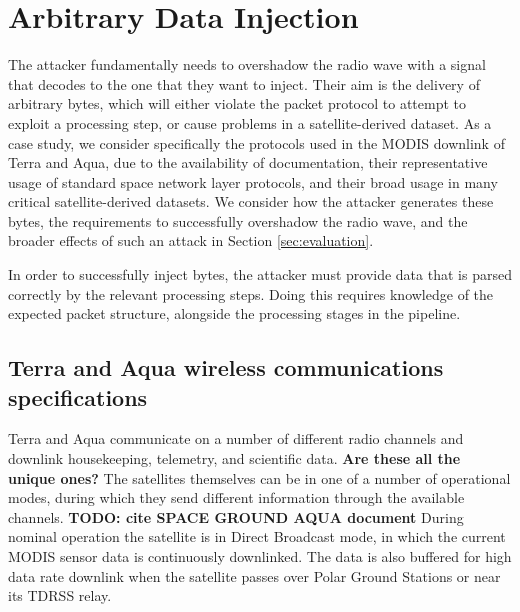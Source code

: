 \section{Arbitrary Data Injection}\label{sec:attack}


%
%


The attacker fundamentally needs to overshadow the radio wave with a signal that decodes to the one that they want to inject.
Their aim is the delivery of arbitrary bytes, which will either violate the packet protocol to attempt to exploit a processing step, or cause problems in a satellite-derived dataset.
As a case study, we consider specifically the protocols used in the MODIS downlink of Terra and Aqua, due to the availability of documentation, their representative usage of standard space network layer protocols, and their broad usage in many critical satellite-derived datasets.
We consider how the attacker generates these bytes, the requirements to successfully overshadow the radio wave, and the broader effects of such an attack in Section \ref{sec:evaluation}.

In order to successfully inject bytes, the attacker must provide data that is parsed correctly by the relevant processing steps.
Doing this requires knowledge of the expected packet structure, alongside the processing stages in the pipeline.

\subsection{Terra and Aqua wireless communications specifications} %

Terra and Aqua communicate on a number of different radio channels and downlink housekeeping, telemetry, and scientific data. \textbf{Are these all the unique ones?}
The satellites themselves can be in one of a number of operational modes, during which they send different information through the available channels. \textbf{TODO: cite SPACE GROUND AQUA document} %
During nominal operation the satellite is in Direct Broadcast mode, in which the current MODIS sensor data is continuously downlinked.
The data is also buffered for high data rate downlink when the satellite passes over Polar Ground Stations or near its TDRSS relay.

